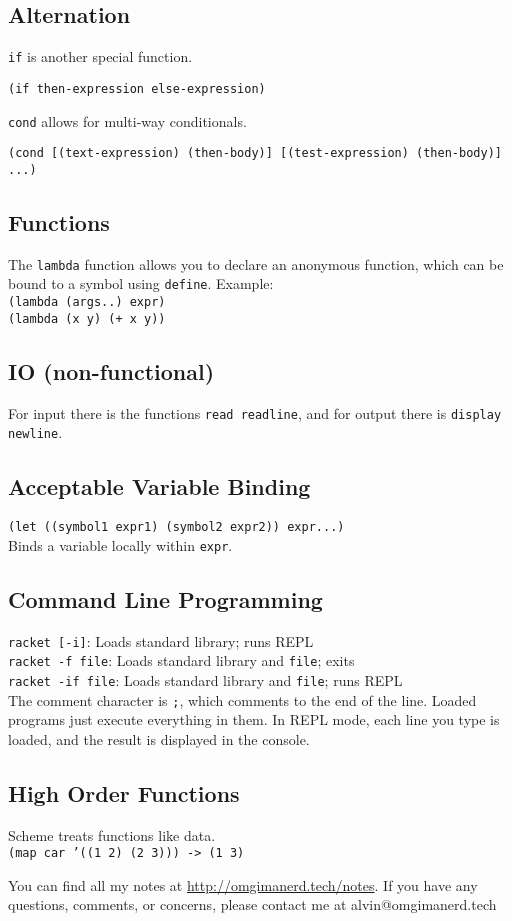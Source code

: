 \documentclass{math}
\begin{document}
\subsection*{Alternation}
\texttt{if} is another special function.
\begin{center}
  \texttt{(if then-expression else-expression)}
\end{center}
\texttt{cond} allows for multi-way conditionals.
\begin{center}
  \texttt{(cond
    [(text-expression) (then-body)] [(test-expression) (then-body)] ...)}
\end{center}

\subsection*{Functions}
The \texttt{lambda} function allows you to declare an anonymous function, which
can be bound to a symbol using \texttt{define}. Example: \\
\texttt{(lambda (args..) expr)} \\
\texttt{(lambda (x y) (+ x y))}

\subsection*{IO (non-functional)}
For input there is the functions \texttt{read readline}, and for output there
is \texttt{display newline}.

\subsection*{Acceptable Variable Binding}
\texttt{(let ((symbol1 expr1) (symbol2 expr2)) expr...)} \\
Binds a variable locally within \texttt{expr}.

\subsection*{Command Line Programming}
\texttt{racket [-i]}: Loads standard library; runs REPL \\
\texttt{racket -f file}: Loads standard library and \texttt{file}; exits \\
\texttt{racket -if file}: Loads standard library and \texttt{file}; runs REPL \\
The comment character is \texttt{;}, which comments to the end of the line.
Loaded programs just execute everything in them. In REPL mode, each line you
type is loaded, and the result is displayed in the console.

\subsection*{High Order Functions}
Scheme treats functions like data. \\
\texttt{(map car '((1 2) (2 3))) -> (1 3)}

\begin{center}
  You can find all my notes at \url{http://omgimanerd.tech/notes}. If you have
  any questions, comments, or concerns, please contact me at
  alvin@omgimanerd.tech
\end{center}
\end{document}
